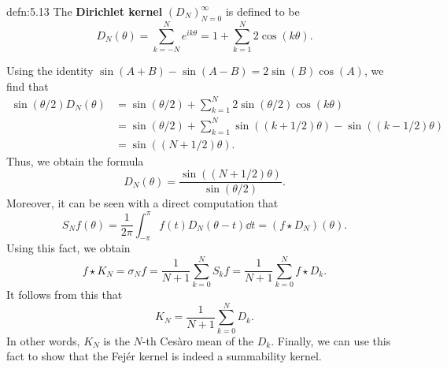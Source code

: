 \begin{defn}{defn:5.13}
    The {\bf Dirichlet kernel} $(D_N)_{N=0}^\infty$ is defined to be 
    \[ D_N(\theta) = \sum_{k=-N}^N e^{ik\theta} = 1 + \sum_{k=1}^N 2\cos(k\theta). \] 
\end{defn}

Using the identity $\sin(A+B) - \sin(A-B) = 2\sin(B)\cos(A)$, we find that 
\begin{align*}
    \sin(\theta/2) D_N(\theta) 
    &= \sin(\theta/2) + \sum_{k=1}^N 2\sin(\theta/2) \cos(k\theta) \\ 
    &= \sin(\theta/2) + \sum_{k=1}^N \sin((k+1/2)\theta) - \sin((k-1/2)\theta) \\ 
    &= \sin((N + 1/2)\theta).     
\end{align*}
Thus, we obtain the formula 
\[ D_N(\theta) = \frac{\sin((N + 1/2)\theta)}{\sin(\theta/2)}. \] 
Moreover, it can be seen with a direct computation that 
\[ S_N f(\theta) = \frac{1}{2\pi} \int_{-\pi}^\pi f(t) D_N(\theta - t)\dd t 
= (f \star D_N)(\theta). \] 
Using this fact, we obtain 
\[ f \star K_N = \sigma_N f = \frac{1}{N+1} \sum_{k=0}^N S_k f 
= \frac{1}{N+1} \sum_{k=0}^N f \star D_k. \] 
It follows from this that 
\[ K_N = \frac{1}{N+1} \sum_{k=0}^N D_k. \] 
In other words, $K_N$ is the $N$-th Ces\`aro mean of the $D_k$. Finally, 
we can use this fact to show that the Fej\'er kernel is indeed a 
summability kernel. 

